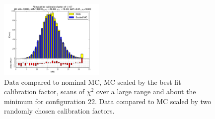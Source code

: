 \begin{figure}[htbp]
\begin{center}
\includegraphics[width=0.45\textwidth]{../FIGURES/22/FIG_Fit_result_for_calibration_factor_of_1_107.pdf} 
\caption{Data compared to nominal MC, MC scaled by the best fit calibration factor, scans of $\chi^2$ over a large range and about the minimum for configuration 22. Data compared to MC scaled by two randomly chosen calibration factors.} 
\label{tab:best_22} 
\end{center} \end{figure} 

